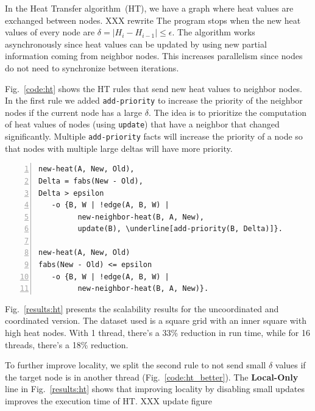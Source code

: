 In the Heat Transfer algorithm~(HT), we have a graph where heat values are
exchanged between nodes. XXX rewrite The program stops when the new heat values of every node are
$\delta = |H_i - H_{i-1}| \le \epsilon$. The algorithm works
asynchronously since heat values can be updated by using new partial information
coming from neighbor nodes. This increases parallelism since nodes do not need
to synchronize between iterations.

Fig.~\ref{code:ht} shows the HT rules that send new heat values to
neighbor nodes. In the first rule we added \texttt{add-priority} to increase the priority of the neighbor
nodes if the current node has a large $\delta$. The idea is to prioritize the
computation of heat values of nodes (using \texttt{update}) that have a neighbor
that changed significantly. Multiple \texttt{add-priority} facts will
increase the priority of a node so that nodes with multiple large deltas will
have more priority.

\begin{topfig}
\scriptsize\begin{Verbatim}[numbers=left,commandchars=\\\[\]]
new-heat(A, New, Old),
Delta = fabs(New - Old),
Delta > epsilon
   -o {B, W | !edge(A, B, W) |
         new-neighbor-heat(B, A, New),
         update(B), \underline[add-priority(B, Delta)]}.

new-heat(A, New, Old)
fabs(New - Old) <= epsilon
   -o {B, W | !edge(A, B, W) |
         new-neighbor-heat(B, A, New)}.
\end{Verbatim}
\end{topfig}
\normalsize

Fig.~\ref{results:ht} presents the scalability results for the uncoordinated
and coordinated version. The dataset used is a square grid with an inner square
with high heat nodes. With 1 thread, there's a 33\% reduction in run time, while
for 16 threads, there's a 18\% reduction.

To further improve locality, we split the second rule to
not send small $\delta$ values if the target node is in another
thread (Fig.~\ref{code:ht_better}). The \textbf{Local-Only} line in
Fig.~\ref{results:ht} shows that improving locality by disabling small updates
improves the execution time of HT. XXX update figure

